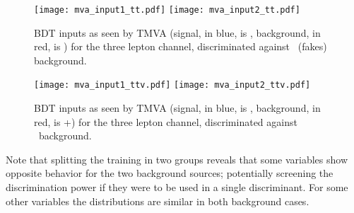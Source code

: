 \begin{figure} [!h]
  \centering
  \texttt{[image: mva\_input1\_tt.pdf]}
  \texttt{[image: mva\_input2\_tt.pdf]}
\caption[BDT input variables. Discrimination against \ttbar.]{BDT inputs as seen by TMVA (signal, in blue, is \tHq, background, in red, is \ttbar) for the three lepton channel, discriminated against \ttbar\ (fakes) background.} 
\label{mva_input_tt}
\end{figure}

\begin{figure} [!h]
  \centering
  \texttt{[image: mva\_input1\_ttv.pdf]}
  \texttt{[image: mva\_input2\_ttv.pdf]}
\caption[BDT input variables. Discrimination against \ttV\ .]{BDT inputs as seen by TMVA (signal, in blue, is \tHq, background, in red, is \ttW+\ttZ) for the three lepton channel, discriminated against \ttV\ background.}                                                                                                                                                         
\label{mva_input_ttv}
\end{figure}



Note that splitting the training in two groups reveals that some variables show opposite behavior for the two background sources; potentially screening the discrimination power if they were to be used in a single discriminant. For some other variables the distributions are similar in both background cases.


